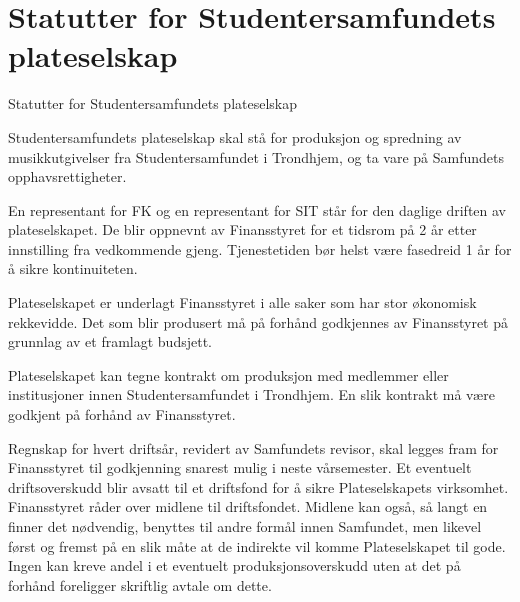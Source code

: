 \chapter{Statutter for Studentersamfundets plateselskap}

\begin{lovkapittel}{Statutter for Studentersamfundets plateselskap}
  
  \begin{lovparagraf}
    Studentersamfundets plateselskap skal stå for produksjon og spredning av musikkutgivelser fra Studentersamfundet i 
    Trondhjem, og ta vare på Samfundets opphavsrettigheter.
  \end{lovparagraf}
  
  \begin{lovparagraf} 
    En representant for FK og en representant for SIT står for den daglige driften av plateselskapet. De blir oppnevnt av
    Finansstyret for et tidsrom på 2 år etter innstilling fra vedkommende gjeng. Tjenestetiden bør helst være fasedreid 1 år
    for å sikre kontinuiteten.
  \end{lovparagraf}
  
  \begin{lovparagraf}
    Plateselskapet er underlagt Finansstyret i alle saker som har stor økonomisk rekkevidde. Det som blir produsert må på
    forhånd godkjennes av Finansstyret på grunnlag av et framlagt budsjett.
  \end{lovparagraf}
  
  \begin{lovparagraf}
    Plateselskapet kan tegne kontrakt om produksjon med medlemmer eller institusjoner innen Studentersamfundet i
    Trondhjem. En slik kontrakt må være godkjent på forhånd av Finansstyret.
  \end{lovparagraf}

  \begin{lovparagraf}
    Regnskap for hvert driftsår, revidert av Samfundets revisor, skal legges fram for Finansstyret til godkjenning snarest
    mulig i neste vårsemester. Et eventuelt driftsoverskudd blir avsatt til et driftsfond for å sikre Plateselskapets
    virksomhet. Finansstyret råder over midlene til driftsfondet. Midlene kan også, så langt en finner det nødvendig,
    benyttes til andre formål innen Samfundet, men likevel først og fremst på en slik måte at de indirekte vil komme
    Plateselskapet til gode. Ingen kan kreve andel i et eventuelt produksjonsoverskudd uten at det på forhånd foreligger
    skriftlig avtale om dette.
  \end{lovparagraf}

\end{lovkapittel} 
